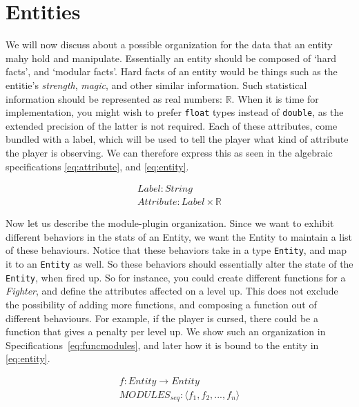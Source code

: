\section{Entities}
\label{sec:entities}

We will now discuss about a possible organization for the data that an entity
mahy hold and manipulate. Essentially an entity should be composed of `hard
facts', and `modular facts'. Hard facts of an entity would be things such as the
entitie's \textit{strength}, \textit{magic}, and other similar information. Such
statistical information should be represented as real numbers: $\mathbb{R}$.
When it is time for implementation, you might wish to prefer \texttt{float}
types instead of \texttt{double}, as the extended precision of the latter is not
required. Each of these attributes, come bundled with a label, which will be
used to tell the player what kind of attribute the player is observing. We can
therefore express this as seen in the algebraic specifications
\ref{eq:attribute}, and \ref{eq:entity}.

\begin{equation}
\begin{split}
  \label{eq:attribute}
  Label\colon String \\
  Attribute\colon Label \times \mathbb{R}
\end{split}
\end{equation}

Now let us describe the module-plugin organization. Since we want to exhibit
different behaviors in the stats of an Entity, we want the Entity to maintain
a list of these behaviours. Notice that these behaviors take in a type
\texttt{Entity}, and map it to an \texttt{Entity} as well. So these behaviors
should essentially alter the state of the \texttt{Entity}, when fired up. So for
instance, you could create different functions for a \textit{Fighter}, and
define the attributes affected on a level up. This does not exclude the
possibility of adding more functions, and composing a function out of different
behaviours. For example, if the player is cursed, there could be a function that
gives a penalty per level up. We show such an organization in
Specifications~\ref{eq:funcmodules}, and later how it is bound to the entity in
\ref{eq:entity}.

\begin{equation}
\begin{split}
  \label{eq:funcmodules}
  f \colon Entity \to Entity \\
  MODULES_{seq}\colon \langle f_1, f_2, ..., f_n \rangle
\end{split}
\end{equation}

